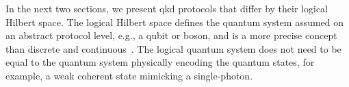 In the next two sections, we present \gls{qkd} protocols that differ by their logical Hilbert space.
The logical Hilbert space defines the quantum system assumed on an abstract protocol level, e.g., a qubit or boson, and is a more precise concept than discrete and continuous~\cite[p.~2]{Weedbrook2012}.
The logical quantum system does not need to be equal to the quantum system physically encoding the quantum states, for example, a weak coherent state mimicking a single-photon.
